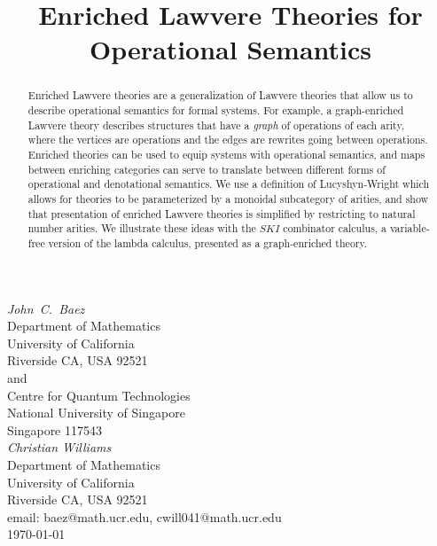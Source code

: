 \documentclass{amsart}
\theoremstyle{definition}
\begin{document}
\title{Enriched Lawvere Theories 
for Operational Semantics}

\maketitle
\begin{center}   
  {\em John\ C.\ Baez \\}
  \vspace{0.3cm}
  {\small
 Department of Mathematics \\
    University of California \\
  Riverside CA, USA 92521 \\ and \\
 Centre for Quantum Technologies  \\
    National University of Singapore \\
    Singapore 117543  \\    } 
  \vspace{0.4cm}
{\em Christian Williams \\}
\vspace{0.3cm}
   {\small
   Department of Mathematics \\
  University of California \\
  Riverside CA, USA 92521 \\}
  \vspace{0.3cm}   
  {\small email:  baez@math.ucr.edu, cwill041@math.ucr.edu\\} 
  \vspace{0.3cm}   
  {\small \today}
  \vspace{0.3cm}   
\end{center} 

\begin{abstract} 
Enriched Lawvere theories are a generalization of Lawvere theories that allow us to describe operational semantics for formal systems.  For example, a graph-enriched Lawvere theory describes structures that have a \emph{graph} of operations of each arity, where the vertices are operations and the edges are rewrites going between operations. Enriched theories can be used to equip systems with operational semantics, and maps between enriching categories can serve to translate between different forms of operational and denotational semantics. We use a definition of Lucyshyn-Wright which allows for theories to be parameterized by a monoidal subcategory of arities, and show that presentation of enriched Lawvere theories is simplified by restricting to natural number arities. We illustrate these ideas with the $SKI$ combinator calculus, a variable-free version of the lambda calculus, presented as a graph-enriched theory.  
\end{abstract}
\end{document}
